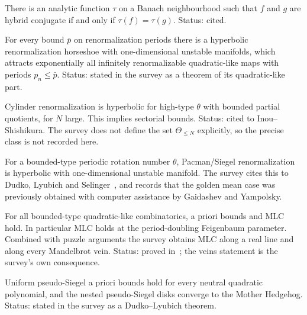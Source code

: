 \begin{theorem}
\label{thm:survey-lyubich-codim}
There is an analytic function $\tau$ on a Banach neighbourhood such that $f$ and
$g$ are hybrid conjugate if and only if $\tau(f)=\tau(g)$.  Status: cited.
\end{theorem}

\begin{theorem}
\label{thm:survey-ql-hyp}
For every bound $\bar p$ on renormalization periods there is a hyperbolic
renormalization horseshoe with one-dimensional unstable manifolds, which attracts
exponentially all infinitely renormalizable quadratic-like maps with periods
$p_n\le\bar p$.  Status: stated in the survey as a theorem of its quadratic-like part.
\end{theorem}

\begin{theorem}
\label{thm:survey-near-parabolic}
Cylinder renormalization is hyperbolic for high-type $\theta$ with bounded
partial quotients, for $N$ large.  This implies sectorial bounds.  Status: cited
to Inou--Shishikura.  The survey does not define the set $\Theta_{\le N}$ explicitly,
so the precise class is not recorded here.
\end{theorem}

\begin{theorem}
\label{thm:survey-pacman}
For a bounded-type periodic rotation number $\theta$, Pacman/Siegel renormalization
is hyperbolic with one-dimensional unstable manifold.  The survey cites this to
Dudko, Lyubich and Selinger~\cite{DudkoLyubichSelinger}, and records that the golden
mean case was previously obtained with computer assistance by Gaidashev and Yampolsky.
\end{theorem}

\begin{theorem}
\label{thm:survey-bounded-ql-mlc}
For all bounded-type quadratic-like combinatorics, a priori bounds and MLC hold.
In particular MLC holds at the period-doubling Feigenbaum parameter.  Combined with
puzzle arguments the survey obtains MLC along a real line and along every
Mandelbrot vein.  Status: proved in~\cite{DudkoLyubichFeigenbaum}; the veins
statement is the survey's own consequence.
\end{theorem}

\begin{theorem}
\label{thm:survey-neutral-bounds}
Uniform pseudo-Siegel a priori bounds hold for every neutral quadratic polynomial,
and the nested pseudo-Siegel disks converge to the Mother Hedgehog.  Status:
stated in the survey as a Dudko--Lyubich theorem.
\end{theorem}

